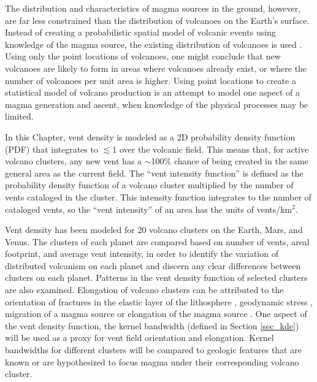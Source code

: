 The distribution and characteristics of magma sources in the ground, however, are far less constrained than the distribution of volcanoes on the Earth's surface. Instead of creating a probabilistic spatial model of volcanic events using knowledge of the magma source, the existing distribution of volcanoes is used \citep{connor2015probabilistic,germa2013tectonic}. Using only the point locations of volcanoes, one might conclude that new volcanoes are likely to form in areas where volcanoes already exist, or where the number of volcanoes per unit area is higher. Using point locations to create a statistical model of volcano production is an attempt to model one aspect of a magma generation and ascent, when knowledge of the physical processes may be limited.

In this Chapter, vent density is modeled as a 2D probability density function (PDF) that integrates to $\lesssim$1 over the volcanic field. This means that, for active volcano clusters, any new vent has a $\sim$100\% chance of being created in the same general area as the current field. The ``vent intensity function'' is defined as the probability density function of a volcano cluster multiplied by the number of vents cataloged in the cluster. This intensity function integrates to the number of cataloged vents, so the ``vent intensity'' of an area has the units of vents/km$^2$.

Vent density has been modeled for 20 volcano clusters on the Earth, Mars, and Venus. The clusters of each planet are compared based on number of vents, areal footprint, and average vent intensity, in order to identify the variation of distributed volcanism on each planet and discern any clear differences between clusters on each planet. Patterns in the vent density function of selected clusters are also examined. Elongation of volcano clusters can be attributed to the orientation of fractures in the elastic layer of the lithosphere \citep{delaney1986field}, geodynamic stress \citep{germa2013tectonic}, migration of a magma source \citep{richardson2013volcanic, tanaka1986migration} or elongation of the magma source \citep{tamura2002hot}. One aspect of the vent density function, the kernel bandwidth (defined in Section \ref{sec_kde}) will be used as a proxy for vent field orientation and elongation. Kernel bandwidths for different clusters will be compared to geologic features that are known or are hypothesized to focus magma under their corresponding volcano cluster.

